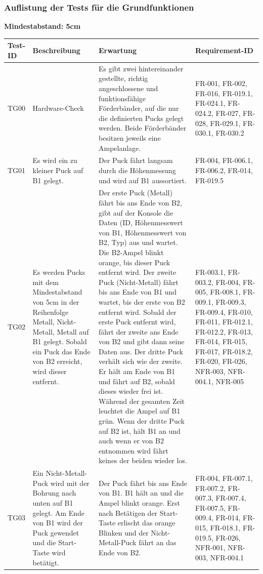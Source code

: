 \documentclass[oneside,a4paper,titlepage]{scrartcl} %
\begin{document}
\subsubsection{Auflistung der Tests für die Grundfunktionen}
\textbf{Mindestabstand: 5cm}
\begin{small}
  \begin{longtable}{|C{1.5cm}|L{4cm}|L{4.5cm}|C{3.0cm}|}
    \hline
    \textbf{Test-ID} & \textbf{Beschreibung} & \textbf{Erwartung} & \textbf{Requirement-ID}\\
    \toprule
    \endhead
    \hline
    TG00 & Hardware-Check & Es gibt zwei hintereinander gestellte, richtig angeschlossene
    und funktionsfähige Förderbänder, auf die nur die definierten Pucks gelegt werden.
    Beide Förderbänder besitzen jeweils eine Ampelanlage. & FR-001, FR-002, FR-016, FR-019.1, FR-024.1, FR-024.2, FR-027, FR-028, FR-029.1, FR-030.1, FR-030.2\\
    \hline
     TG01 & Es wird ein zu kleiner Puck auf B1 gelegt. & Der Puck fährt langsam durch die Höhenmessung und wird auf B1 aussortiert. & FR-004, FR-006.1, FR-006.2, FR-014, FR-019.5\\
    \hline
    TG02 & Es werden Pucks mit dem Mindestabstand von 5cm in der Reihenfolge Metall, Nicht-Metall, Metall auf B1 gelegt. Sobald ein Puck das Ende von B2 erreicht, wird dieser entfernt. & Der erste Puck (Metall) fährt bis ans Ende von B2, gibt auf der Konsole die Daten (ID, Höhenmesswert von B1, Höhenmesswert von B2, Typ) aus und wartet.
    Die B2-Ampel blinkt orange, bis dieser Puck entfernt wird.
    Der zweite Puck (Nicht-Metall) fährt bis ans Ende von B1 und wartet, bis der erste von B2 entfernt wird.
    Sobald der erste Puck entfernt wird, fährt der zweite ans Ende von B2 und gibt dann seine Daten aus.
    Der dritte Puck verhält sich wie der zweite. Er hält am Ende von B1 und fährt auf B2, sobald dieses wieder frei ist. Während der gesamten Zeit leuchtet die Ampel auf B1 grün.
    Wenn der dritte Puck auf B2 ist, hält B1 an und auch wenn er von B2 entnommen wird fährt keines der beiden wieder los. & FR-003.1, FR-003.2, FR-004, FR-005, FR-008.1, FR-009.1, FR-009.3, FR-009.4, FR-010, FR-011, FR-012.1, FR-012.2, FR-013, FR-014, FR-015, FR-017, FR-018.2, FR-020, FR-026, NFR-003, NFR-004.1, NFR-005\\
    \hline
     TG03 & Ein Nicht-Metall-Puck wird mit der Bohrung nach unten auf B1 gelegt. Am Ende von B1 wird der Puck gewendet und die Start-Taste wird betätigt. & Der Puck fährt bis ans Ende von B1. B1 hält an und die Ampel blinkt orange. Erst nach Betätigen der Start-Taste erlischt das orange Blinken und der Nicht-Metall-Puck fährt an das Ende von B2. & FR-004, FR-007.1, FR-007.2, FR-007.3, FR-007.4, FR-007.5, FR-009.4, FR-014, FR-015, FR-018.1, FR-019.5, FR-026, NFR-001, NFR-003, NFR-004.1\\

\end{longtable}
\end{small}
\end{document}
